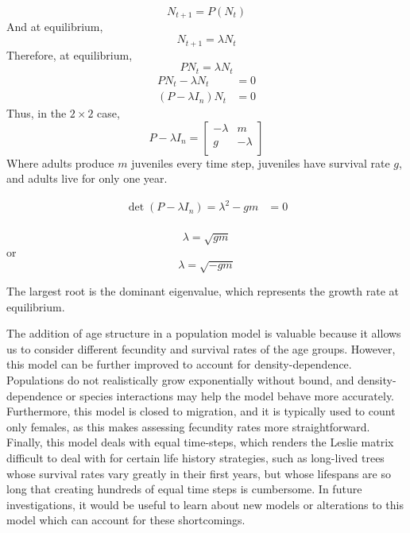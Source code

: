 \documentclass[12pt]{article}
\begin{document}
\begin{equation*}
    N_{t+1}=P(N_t)
\end{equation*}
And at equilibrium,
\begin{equation*}
    N_{t+1}=\lambda N_t
\end{equation*}
Therefore, at equilibrium,
\begin{equation*}
   PN_t=\lambda N_t
\end{equation*}
\begin{align*}
   PN_t-\lambda N_t&=0\\
   (P-\lambda I_n)N_t&=0
\end{align*}
Thus, in the $2 \times 2$ case,
\begin{equation*}
P-\lambda I_n=
    \begin{bmatrix}
    -\lambda&m\\
    g&-\lambda\\
    \end{bmatrix}
\end{equation*}
Where adults produce $m$ juveniles every time step, juveniles have survival rate $g$, and adults live for only one year.

\begin{align*}
    \det(P-\lambda I_n)=\lambda^2-gm&=0\\
\end{align*}

\begin{equation*}
        \lambda=\sqrt{gm}  
\end{equation*}
or
\begin{equation*}
   \lambda= \sqrt{-gm}
\end{equation*}

The largest root is the dominant eigenvalue, which represents the growth rate at equilibrium.

The addition of age structure in a population model is valuable because it allows us to consider different fecundity and survival rates of the age groups. However, this model can be further improved to account for density-dependence. Populations do not realistically grow exponentially without bound, and density-dependence or species interactions may help the model behave more accurately. Furthermore, this model is closed to migration, and it is typically used to count only females, as this makes assessing fecundity rates more straightforward. Finally, this model deals with equal time-steps, which renders the Leslie matrix difficult to deal with for certain life history strategies, such as long-lived trees whose survival rates vary greatly in their first years, but whose lifespans are so long that creating hundreds of equal time steps is cumbersome. In future investigations, it would be useful to learn about new models or alterations to this model which can account for these shortcomings.
\end{document}
